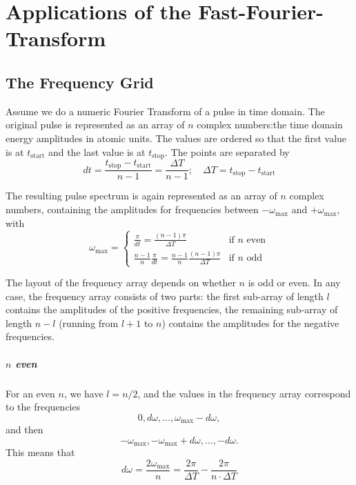 \chapter{Applications of the Fast-Fourier-Transform}
\label{AppendixFFT}

\section{The Frequency Grid}

Assume we do a numeric Fourier Transform of a pulse in time domain. The
original pulse is represented as an array of $n$ complex numbers:the time
domain energy amplitudes in atomic units. The values are ordered so that the
first value is at $t_{\text{start}}$ and the last value is at
$t_{\text{stop}}$.%
The points are separated by
\begin{equation}
  dt = \frac{t_{\text{stop}}-t_{\text{start}}}{n-1} = \frac{\Delta T}{n-1};
  \quad
  \Delta T=t_{\text{stop}}-t_{\text{start}}
\end{equation}

The resulting pulse spectrum is again represented as an array of
$n$ complex numbers, containing the amplitudes for frequencies between
$-\omega_{\max}$ and $+\omega_{\max}$, with
\begin{equation}
  \omega_{\max} = \begin{cases}
     \frac{\pi}{dt} = \frac{(n-1)\pi}{\Delta T}
                      & \text{if $n$ even} \\
     \frac{n-1}{n} \frac{\pi}{dt} = \frac{n-1}{n} \frac{(n-1)\pi}{\Delta T}
                      & \text{if $n$ odd}
                  \end{cases}
\end{equation}

The layout of the frequency array depends on whether $n$ is odd or even. In any
case, the frequency array consists of two parts: the first sub-array of length $l$
contains the amplitudes of the positive frequencies, the remaining sub-array of
length $n-l$ (running from $l+1$ to $n$) contains the amplitudes for the
negative frequencies.

\paragraph{$n$ even}
For an even $n$, we have $l=n/2$, and the values in the frequency array correspond
to the frequencies $$0, d\omega, \dots, \omega_{\max}-d\omega,$$ and then
$$-\omega_{\max}, -\omega_{\max}+d\omega, \dots, -d\omega.$$ This means that
\begin{equation}
  d\omega = \frac{2 \omega_{\max}}{n} = \frac{2\pi}{\Delta T} - \frac{2\pi}{n \cdot \Delta T}
\end{equation}

